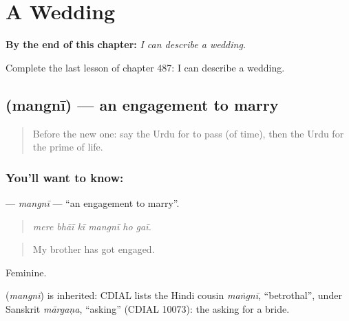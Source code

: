 
\chapter{A Wedding}
\label{ch:ur-a-wedding}

\begin{chapteropening}
\textbf{By the end of this chapter:} \emph{I can describe a wedding.}

Complete the last lesson of chapter 487: I can describe a wedding.
\end{chapteropening}

\section[\texorpdfstring{\ur{منگنی} (mangnī)}{منگنی (mangnī)}]{ (mangnī) — an engagement to marry}

\label{lesson:UR-C487-mangni}



\begin{quote}
Before the new one: say the Urdu for to pass (of time), then the Urdu for the prime of life.
\end{quote}

\subsection*{You'll want to know: }
\textbf{} — \emph{mangnī} — \textquotedblleft{}an engagement to marry\textquotedblright{}.

\begin{quote}
     
\end{quote}

\begin{quote}
\emph{mere bhāī kī mangnī ho gaī.}
\end{quote}

\begin{quote}
My brother has got engaged.
\end{quote}

Feminine.

\begin{cousinweb}
\textbf{} (\emph{mangnī}) is inherited: CDIAL lists the Hindi cousin \emph{maṅgnī}, \textquotedblleft{}betrothal\textquotedblright{}, under Sanskrit \emph{mārgaṇa}, \textquotedblleft{}asking\textquotedblright{} (CDIAL 10073): the asking for a bride.
\end{cousinweb}

